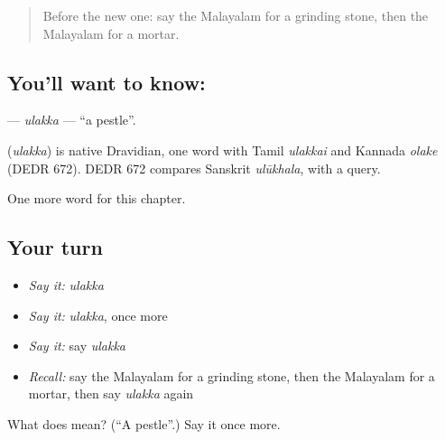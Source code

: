 \begin{quote}
Before the new one: say the Malayalam for a grinding stone, then the Malayalam for a mortar.
\end{quote}

\subsection*{You'll want to know: }
\textbf{} — \emph{ulakka} — \textquotedblleft{}a pestle\textquotedblright{}.

\begin{cousinweb}
\textbf{} (\emph{ulakka}) is native Dravidian, one word with Tamil \emph{ulakkai} and Kannada \emph{olake} (DEDR 672). DEDR 672 compares Sanskrit \emph{ulūkhala}, with a query.
\end{cousinweb}

\begin{grammarlens}[title={What you've built}]
One more word for this chapter.
\end{grammarlens}

\subsection*{Your turn}
\begin{itemize}
\raggedright
  \item \emph{Say it:} \emph{ulakka}
  \item \emph{Say it:} \emph{ulakka}, once more
  \item \emph{Say it:} say \emph{ulakka}
  \item \emph{Recall:} say the Malayalam for a grinding stone, then the Malayalam for a mortar, then say \emph{ulakka} again
\end{itemize}

\begin{tcolorbox}[breakable,colback=teal!4,colframe=teal!35!black,title={Before you move on}]
What does  mean? (\textquotedblleft{}A pestle\textquotedblright{}.) Say it once more.
\end{tcolorbox}
